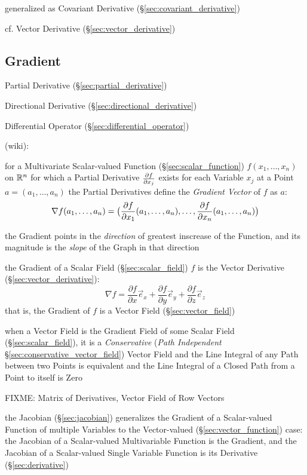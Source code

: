 \fist generalized as Covariant Derivative (\S\ref{sec:covariant_derivative})

cf. Vector Derivative (\S\ref{sec:vector_derivative})



\subsection{Gradient}\label{sec:gradient}

Partial Derivative (\S\ref{sec:partial_derivative})

Directional Derivative (\S\ref{sec:directional_derivative})

Differential Operator (\S\ref{sec:differential_operator})

(wiki):

for a Multivariate Scalar-valued Function (\S\ref{sec:scalar_function}) $f(x_1,
\ldots, x_n)$ on $\mathbb{R}^n$ for which a Partial Derivative $\frac{\partial{f}}{\partial{x_j}}$
exists for each Variable $x_j$ at a Point $a = (a_1, \ldots, a_n)$ the Partial
Derivatives define the \emph{Gradient Vector} of $f$ as $a$:
\[
  \nabla{f}(a_1, \ldots, a_n) = \big( \frac{\partial{f}}{\partial{x_1}}(a_1, \ldots, a_n), \ldots,
  \frac{\partial{f}}{\partial{x_n}}(a_1, \ldots, a_n) \big)
\]

the Gradient points in the \emph{direction} of greatest inscrease of the
Function, and its magnitude is the \emph{slope} of the Graph in that direction

the Gradient of a Scalar Field (\S\ref{sec:scalar_field}) $f$ is the Vector
Derivative (\S\ref{sec:vector_derivative}):
\[
  \nabla f =
    \frac{\partial f}{\partial x}\vec{e}_x +
    \frac{\partial f}{\partial y}\vec{e}_y +
    \frac{\partial f}{\partial z}\vec{e}_z
\]
that is, the Gradient of $f$ is a Vector Field (\S\ref{sec:vector_field})

when a Vector Field is the Gradient Field of some Scalar Field
(\S\ref{sec:scalar_field}), it is a \emph{Conservative} (\emph{Path
  Independent} \S\ref{sec:conservative_vector_field}) Vector Field and the Line
Integral of any Path between two Points is equivalent and the Line Integral of
a Closed Path from a Point to itself is Zero

FIXME: Matrix of Derivatives, Vector Field of Row Vectors

the Jacobian (\S\ref{sec:jacobian}) generalizes the Gradient of a Scalar-valued
Function of multiple Variables to the Vector-valued
(\S\ref{sec:vector_function}) case: the Jacobian of a Scalar-valued
Multivariable Function is the Gradient, and the Jacobian of a Scalar-valued
Single Variable Function is its Derivative (\S\ref{sec:derivative})

